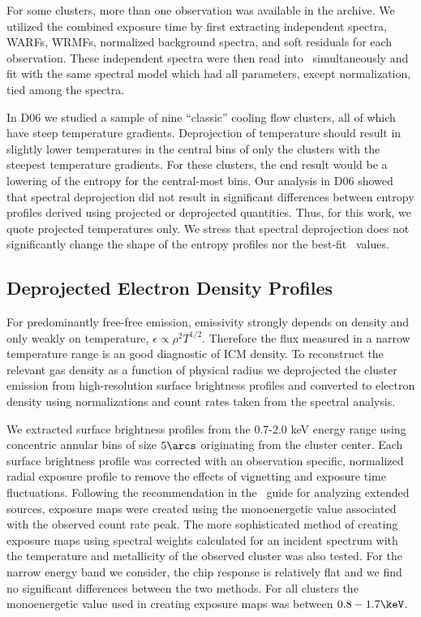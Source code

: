 For some clusters, more than one observation was available in the
archive. We utilized the combined exposure time by first extracting
independent spectra, WARFs, WRMFs, normalized background spectra, and
soft residuals for each observation. These independent spectra were
then read into \xspec\ simultaneously and fit with the same spectral
model which had all parameters, except normalization, tied among the
spectra.

In D06 we studied a sample of nine ``classic'' cooling flow clusters,
all of which have steep temperature gradients. Deprojection of
temperature should result in slightly lower temperatures in the
central bins of only the clusters with the steepest temperature
gradients. For these clusters, the end result would be a lowering of
the entropy for the central-most bins. Our analysis in D06 showed that
spectral deprojection did not result in significant differences
between entropy profiles derived using projected or deprojected
quantities. Thus, for this work, we quote projected temperatures
only. We stress that spectral deprojection does not significantly
change the shape of the entropy profiles nor the best-fit
\kna\ values.

\subsection{Deprojected Electron Density Profiles}
\label{sec:entsuppdene}

For predominantly free-free emission, emissivity strongly depends on
density and only weakly on temperature, $\epsilon \propto \rho^2
T^{1/2}$. Therefore the flux measured in a narrow temperature range is
an good diagnostic of ICM density. To reconstruct the relevant gas
density as a function of physical radius we deprojected the cluster
emission from high-resolution surface brightness profiles and
converted to electron density using normalizations and count rates
taken from the spectral analysis.

We extracted surface brightness profiles from the 0.7-2.0 keV energy
range using concentric annular bins of size $5\arcs$ originating from the
cluster center. Each surface brightness profile was corrected with an
observation specific, normalized radial exposure profile to remove the
effects of vignetting and exposure time fluctuations. Following the
recommendation in the \ciao\ guide for analyzing extended sources,
exposure maps were created using the monoenergetic value associated
with the observed count rate peak. The more sophisticated method of
creating exposure maps using spectral weights calculated for an
incident spectrum with the temperature and metallicity of the observed
cluster was also tested. For the narrow energy band we consider, the
chip response is relatively flat and we find no significant
differences between the two methods. For all clusters the
monoenergetic value used in creating exposure maps was between
$0.8-1.7\keV$.

